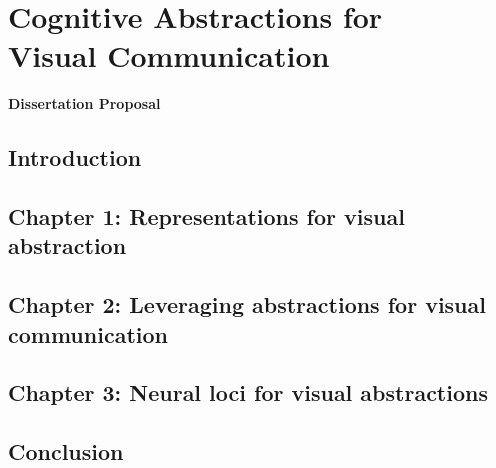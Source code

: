 \documentclass{Dissertate}
\begin{document}
\chapter*{\centering Cognitive Abstractions for \\ Visual Communication}

{\centering \large \textbf{Dissertation Proposal} \par}


\section*{Introduction}

\section*{Chapter 1: Representations for visual abstraction}

\section*{Chapter 2: Leveraging abstractions for visual communication }

\section*{Chapter 3: Neural loci for visual abstractions}

\section*{Conclusion}





% 
\end{document}
